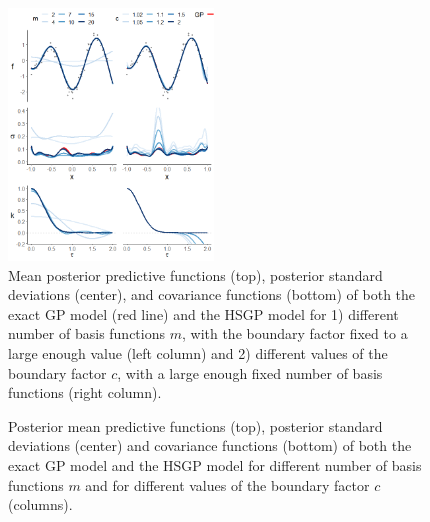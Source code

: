 \begin{figure}
\includegraphics[width=0.485\textwidth, trim = 2mm 0mm 0mm 0mm, clip]{fig1_Post_J_L.png}
\vspace{-1mm}
\caption{Mean posterior predictive functions (top), posterior standard deviations (center), and covariance functions (bottom) of both the exact GP model (red line) and the HSGP model for 1) different number of basis functions $m$, with the boundary factor fixed to a large enough value (left column) and 2) different values of the boundary factor $c$, with a large enough fixed number of basis functions (right column).}
  \label{fig1_Post_J_L}
\end{figure}

\begin{figure}
\centering
{}
\vspace{-1mm}
\caption{Posterior mean predictive functions (top), posterior standard deviations (center) and  covariance functions (bottom) of both the exact GP model and the HSGP model for different number of basis functions $m$ and for different values of the boundary factor $c$ (columns).}
  \label{fig2_Post}
\end{figure}

